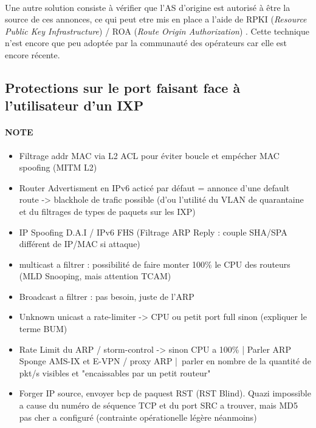 \paragraph{}
Une autre solution consiste à vérifier que l'AS d'origine est autorisé à être la source de ces annonces, ce qui peut etre mis en place a l'aide de RPKI (\emph{Resource Public Key Infrastructure}) / ROA (\emph{Route Origin Authorization}) \cite{fenioux:RPKIROA}. Cette technique n'est encore que peu adoptée par la communauté des opérateurs car elle est encore récente.


\subsection{Protections sur le port faisant face à l'utilisateur d'un IXP}

\paragraph{NOTE}
\begin{itemize}
\item Filtrage addr MAC via L2 ACL pour éviter boucle et empécher MAC spoofing (MITM L2)
\item Router Advertisment en IPv6 acticé par défaut = annonce d'une default route -> blackhole de trafic possible (d'ou l'utilité du VLAN de quarantaine et du filtrages de types de paquets sur les IXP)
\item IP Spoofing D.A.I / IPv6 FHS (Filtrage ARP Reply : couple SHA/SPA différent de IP/MAC si attaque)
\item multicast a filtrer : possibilité de faire monter 100\% le CPU des routeurs (MLD Snooping, mais attention TCAM)
\item Broadcast a filtrer : pas besoin, juste de l'ARP
\item Unknown unicast a rate-limiter -> CPU ou petit port full sinon (expliquer le terme BUM)
\item Rate Limit du ARP / storm-control  -> sinon CPU a 100\% | Parler ARP Sponge AMS-IX et E-VPN / proxy ARP | parler en nombre de la quantité de pkt/s visibles et "encaissables par un petit routeur"
\item Forger IP source, envoyer bcp de paquest RST (RST Blind). Quazi impossible a cause du numéro de séquence TCP et du port SRC a trouver, mais MD5 pas cher a configuré (contrainte opérationelle légère néanmoins)

\end{itemize}


